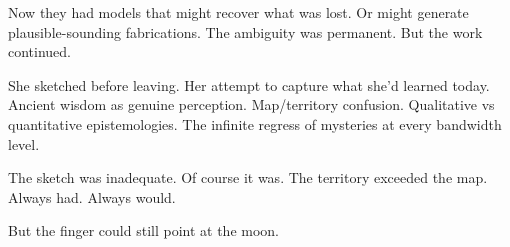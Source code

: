 Now they had models that might recover what was lost. Or might generate plausible-sounding fabrications. The ambiguity was permanent. But the work continued.

She sketched before leaving. Her attempt to capture what she'd learned today. Ancient wisdom as genuine perception. Map/territory confusion. Qualitative vs quantitative epistemologies. The infinite regress of mysteries at every bandwidth level.

The sketch was inadequate. Of course it was. The territory exceeded the map. Always had. Always would.

But the finger could still point at the moon.

